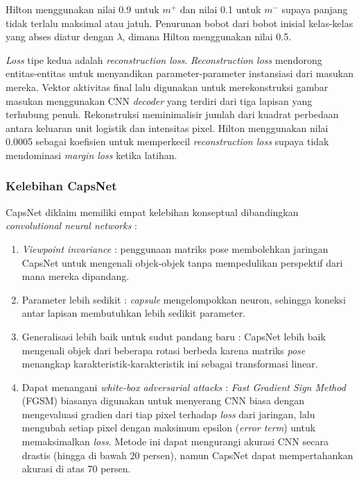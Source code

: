 \documentclass{article}
\begin{document}
		   	
		Hilton menggunakan nilai 0.9 untuk $m^{+}$ dan nilai 0.1 untuk $m^{-}$ supaya panjang tidak terlalu maksimal atau jatuh. Penurunan bobot dari bobot inisial kelas-kelas yang abses diatur dengan $\lambda$, dimana Hilton menggunakan nilai 0.5. 
	   	\par 
	   	\textit{Loss} tipe kedua adalah \textit{reconstruction loss}. \textit{Reconstruction loss} mendorong entitas-entitas untuk  menyandikan parameter-parameter instansiasi dari masukan mereka. Vektor aktivitas final lalu digunakan untuk merekonstruksi gambar masukan menggunakan CNN \textit{decoder} yang terdiri dari tiga lapisan yang terhubung penuh. Rekonstruksi meminimalisir jumlah dari kuadrat perbedaan antara keluaran unit logistik dan intensitas pixel. Hilton menggunakan nilai 0.0005 sebagai koefisien untuk memperkecil \textit{reconstruction loss} supaya tidak mendominasi \textit{margin loss} ketika latihan. 
	   	
	   	\subsubsection{Kelebihan CapsNet}
	   	CapsNet diklaim memiliki empat kelebihan konseptual dibandingkan \textit{convolutional neural networks} :
	   	
	   	\begin{enumerate}
	   	 \item \textit{Viewpoint invariance} : penggunaan matriks pose membolehkan jaringan CapsNet untuk mengenali objek-objek tanpa mempedulikan perspektif dari mana mereka dipandang.
	   	 \item Parameter lebih sedikit : \textit{capsule} mengelompokkan neuron, sehingga koneksi antar lapisan membutuhkan lebih sedikit parameter.
	   	 \item Generalisasi lebih baik untuk sudut pandang baru : CapsNet lebih baik mengenali objek dari beberapa rotasi berbeda karena matriks \textit{pose} menangkap karakteristik-karakteristik ini sebagai transformasi linear.
	   	 \item Dapat menangani \textit{white-box adversarial attacks} : \textit{Fast Gradient Sign Method} (FGSM) biasanya digunakan untuk menyerang CNN biasa dengan mengevaluasi gradien dari tiap pixel terhadap \textit{loss} dari jaringan, lalu mengubah setiap pixel dengan maksimum epsilon (\textit{error term}) untuk memaksimalkan \textit{loss}. Metode ini dapat mengurangi akurasi CNN secara drastis (hingga di bawah 20 persen), namun CapsNet dapat mempertahankan akurasi di atas 70 persen. 
	   	\end{enumerate}
\end{document}
